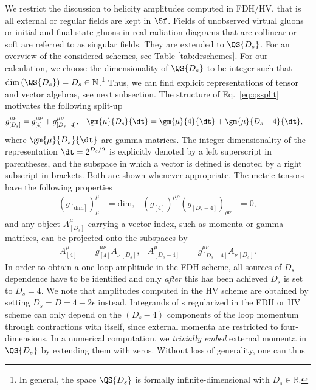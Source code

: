 We restrict the discussion to helicity amplitudes computed in FDH/HV,
that is all external or regular fields are kept in $\Sf$. Fields of
unobserved virtual gluons or initial and final state gluons in real
radiation diagrams that are collinear or soft are referred to as
singular fields. They are
extended to $\QS{D_s}$. For an overview of the considered schemes,
see Table \ref{tab:drschemes}. For our calculation, we choose the dimensionality of $\QS{D_s}$ to
be integer such that
$\text{dim}\left(\QS{D_s}\right) = D_s \in \mathbb{N}$.\footnote{In
  general, the space $\QS{D_s}$ is formally infinite-dimensional with
  $D_s\in \mathbb{R}$.} Thus, we can find explicit representations of tensor and vector algebras,
see next subsection. The structure of Eq.~\eqref{eq:qssplit}
motivates the following split-up 
\begin{align}
    g_{[D_s]}^{\mu\nu} &= g^{\mu\nu}_{[4]}+g^{\mu\nu}_{[D_s-4]}, &
    \gm{\mu}{D_s}{\dt} &= \gm{\mu}{4}{\dt}+  \gm{\mu}{D_s-4}{\dt},
\end{align}
where $\gm{\mu}{D_s}{\dt}$ are gamma matrices. The integer
dimensionality of the representation $\dt=2^{D_s/2}$ is explicitly denoted by a left superscript in
parentheses, and the subspace in which a vector is defined is denoted
by a right subscript in brackets. Both are shown whenever appropriate. The metric tensors have the following properties
\begin{align}
(g_{[\text{dim}]})^{\mu}_\mu &= \text{dim},
&(g_{[4]})^{\mu\rho}(g_{[D_s-4]})_{\rho\nu} &= 0,
\end{align}
and any object $A_{[D_s]}^\mu$ carrying a vector index, such as momenta or gamma
matrices, can be projected onto the subspaces by
\begin{align}
   A_{[4]}^\mu &= g^{\mu\nu}_{[4]} A_{\nu\,[D_s]}^{\phantom{\mu}}, & A_{[D_s-4]}^\mu &= g^{\mu\nu}_{[D_s-4]} A_{\nu\,[D_s]}^{\phantom{\mu}}.
  \end{align}
In order to obtain a one-loop amplitude in the FDH scheme, all sources
of $D_s$-dependence have to be identified and only \textit{after} this has been
achieved $D_s$ is
set to $D_s=4$. We note that amplitudes computed in the HV scheme are obtained by setting
$D_s=D=4-2\epsilon$ instead. Integrands of \ola s regularized in the
FDH or HV scheme can only depend on the
$(D_s-4)$ components of the loop momentum through contractions with itself,
since external momenta are restricted to four-dimensions. In a
numerical computation, we \textit{trivially
  embed} external momenta in $\QS{D_s}$ by
extending them with zeros. Without loss of generality, one can thus
